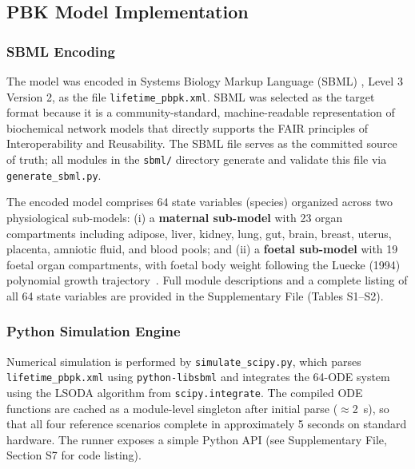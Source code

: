 \documentclass[preprint,12pt]{elsarticle}
\begin{document}
\begin{linenumbers}
\subsection{PBK Model Implementation}

\subsubsection{SBML Encoding}

The model was encoded in Systems Biology Markup Language (SBML)
\cite{hucka2003}, Level 3 Version 2, as the file
\texttt{lifetime\_pbpk.xml}. SBML was selected as the target format
because it is a community-standard, machine-readable representation
of biochemical network models that directly supports the FAIR
principles of Interoperability and Reusability. The SBML file serves
as the committed source of truth; all modules in the \texttt{sbml/}
directory generate and validate this file via
\texttt{generate\_sbml.py}.

The encoded model comprises 64 state variables (species) organized
across two physiological sub-models: (i) a \textbf{maternal sub-model}
with 23 organ compartments including adipose, liver, kidney, lung, gut,
brain, breast, uterus, placenta, amniotic fluid, and blood pools; and
(ii) a \textbf{foetal sub-model} with 19 foetal organ compartments,
with foetal body weight following the Luecke (1994) polynomial growth
trajectory~\cite{luecke1994}. Full module descriptions and a complete
listing of all 64 state variables are provided in the Supplementary
File (Tables S1--S2).


\subsubsection{Python Simulation Engine}

Numerical simulation is performed by \texttt{simulate\_scipy.py},
which parses \texttt{lifetime\_pbpk.xml} using \texttt{python-libsbml}
and integrates the 64-ODE system using the LSODA algorithm from
\texttt{scipy.integrate}. The compiled ODE functions are cached as a
module-level singleton after initial parse ($\approx$2~s), so that
all four reference scenarios complete in approximately 5 seconds on
standard hardware. The runner exposes a simple Python API (see
Supplementary File, Section S7 for code listing).


\end{linenumbers}
\end{document}
